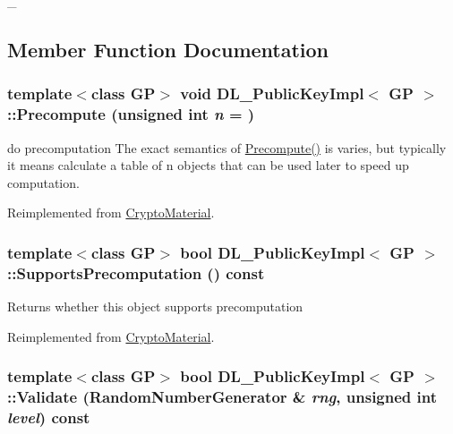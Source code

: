 \_\- 

\subsection{Member Function Documentation}
\hypertarget{class_d_l___public_key_impl_a95e25f6632ec2621289d10abc557b17b}{
\subsubsection[{Precompute}]{\setlength{\rightskip}{0pt plus 5cm}template$<$class GP$>$ void {\bf DL\_\-PublicKeyImpl}$<$ GP $>$::Precompute (unsigned int {\em n} = {})}}
\label{class_d_l___public_key_impl_a95e25f6632ec2621289d10abc557b17b}


do precomputation The exact semantics of \hyperlink{class_d_l___public_key_impl_a95e25f6632ec2621289d10abc557b17b}{Precompute()} is varies, but typically it means calculate a table of n objects that can be used later to speed up computation. 

Reimplemented from \hyperlink{class_crypto_material_a39e512d2ea70d0e967db98c19994a7fd}{CryptoMaterial}.\hypertarget{class_d_l___public_key_impl_a16711647065fe1c20f118460646ccc38}{
\subsubsection[{SupportsPrecomputation}]{\setlength{\rightskip}{0pt plus 5cm}template$<$class GP$>$ bool {\bf DL\_\-PublicKeyImpl}$<$ GP $>$::SupportsPrecomputation () const}}
\label{class_d_l___public_key_impl_a16711647065fe1c20f118460646ccc38}
\begin{DoxyReturn}{Returns}
whether this object supports precomputation 
\end{DoxyReturn}


Reimplemented from \hyperlink{class_crypto_material_a64ab4ff4adfcfc2da59706ac32895b50}{CryptoMaterial}.\hypertarget{class_d_l___public_key_impl_a85fab6591b1420642f414d6d9669b298}{
\subsubsection[{Validate}]{\setlength{\rightskip}{0pt plus 5cm}template$<$class GP$>$ bool {\bf DL\_\-PublicKeyImpl}$<$ GP $>$::Validate ({\bf RandomNumberGenerator} \& {\em rng}, \/  unsigned int {\em level}) const}}
\label{class_d_l___public_key_impl_a85fab6591b1420642f414d6d9669b298}


